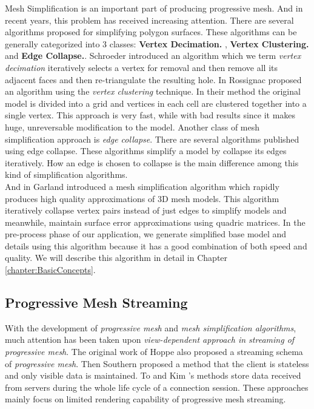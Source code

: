Mesh Simplification is an important part of producing progressive mesh. And in recent years, this problem has received increasing attention. There are several algorithms proposed for simplifying polygon surfaces. These algorithms can be generally categorized into 3 classes: \textbf{Vertex Decimation.	}, \textbf{Vertex Clustering.} and \textbf{Edge Collapse.}. 
Schroeder \etal \cite{Schroeder:1992:DTM} introduced an algorithm which we term \emph{vertex decimation} iteratively selects a vertex for removal and then remove all its adjacent faces and then re-triangulate the resulting hole. In \cite{Rossignac:93:MRARCS} Rossignac \etal proposed an algorithm using the \emph{vertex clustering} technique. In their method the original model is divided into a grid and vertices in each cell are clustered together into a single vertex. This approach is very fast, while with bad results since it makes huge, unreversable modification to the model. Another class of mesh simplification approach is \emph{edge collapse}. There are several algorithms \cite{Hoppe:1993:MO}\cite{Hoppe:1996:PM}\cite{RRR96}\cite{Gueziec:95:SSVT} published using edge collapse. These algorithms simplify a model by collapse its edges iteratively. How an edge is chosen to collapse is the main difference among this kind of simplification algorithms. \\

And in \cite{Garland:1997:SSU} Garland \etal introduced a mesh simplification algorithm which rapidly produces high quality approximations of 3D mesh models. This algorithm iteratively collapse vertex pairs instead of just edges to simplify models and meanwhile, maintain surface error approximations using quadric matrices. 
In the pre-process phase of our application, we generate simplified base model and details using this algorithm because it has a good combination of both speed and quality. We will describe this algorithm in detail in Chapter \ref{chapter:BasicConcepts}. 

\subsection{Progressive Mesh Streaming}
\label{subsection:relWork:vdpms}

With the development of \emph{progressive mesh} and \emph{mesh simplification algorithms}, much attention has been taken upon \emph{view-dependent approach in streaming of progressive mesh}. The original work of Hoppe\cite{Hoppe:1996:PM} also proposed a streaming schema of \emph{progressive mesh}. Then Southern \etal \cite{Southern:2001:SCP} proposed a method that the client is stateless and only visible data is maintained. To \etal\cite{To:1999:MPS} and Kim \etal \cite{KimLK05:0}'s methods store data received from servers during the whole life cycle of a connection session. These approaches mainly focus on limited rendering capability of progressive mesh streaming.\\

